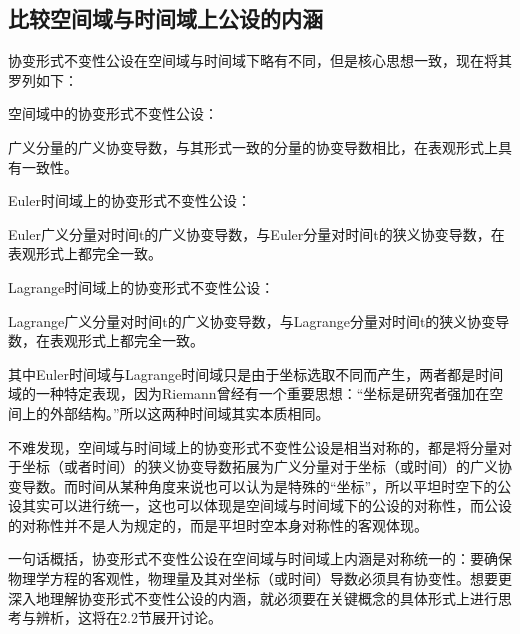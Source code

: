 \documentclass[UTF8]{ctexart}
\begin{document}
\subsection{比较空间域与时间域上公设的内涵}
协变形式不变性公设在空间域与时间域下略有不同，但是核心思想一致，现在将其罗列如下：\par
空间域中的协变形式不变性公设：\par
广义分量的广义协变导数，与其形式一致的分量的协变导数相比，在表观形式上具有一致性。\par
Euler时间域上的协变形式不变性公设：\par
Euler广义分量对时间t的广义协变导数，与Euler分量对时间t的狭义协变导数，在表观形式上都完全一致。\par
Lagrange时间域上的协变形式不变性公设：\par
Lagrange广义分量对时间t的广义协变导数，与Lagrange分量对时间t的狭义协变导数，在表观形式上都完全一致。\par
其中Euler时间域与Lagrange时间域只是由于坐标选取不同而产生，两者都是时间域的一种特定表现，因为Riemann曾经有一个重要思想：“坐标是研究者强加在空间上的外部结构。”所以这两种时间域其实本质相同。\par
不难发现，空间域与时间域上的协变形式不变性公设是相当对称的，都是将分量对于坐标（或者时间）的狭义协变导数拓展为广义分量对于坐标（或时间）的广义协变导数。而时间从某种角度来说也可以认为是特殊的“坐标”，所以平坦时空下的公设其实可以进行统一，这也可以体现是空间域与时间域下的公设的对称性，而公设的对称性并不是人为规定的，而是平坦时空本身对称性的客观体现。\par
一句话概括，协变形式不变性公设在空间域与时间域上内涵是对称统一的：要确保物理学方程的客观性，物理量及其对坐标（或时间）导数必须具有协变性。想要更深入地理解协变形式不变性公设的内涵，就必须要在关键概念的具体形式上进行思考与辨析，这将在2.2节展开讨论。\par
\end{document}
